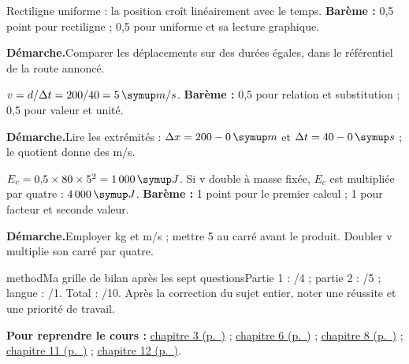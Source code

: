 \label{cor-bb-1}
\par\noindent\begin{minipage}{\linewidth}
Rectiligne uniforme : la position croît linéairement avec le temps. \textbf{Barème :} 0,5 point pour rectiligne ; 0,5 pour uniforme et sa lecture graphique.\par
\smallskip\noindent\textbf{Démarche.}\enspace Comparer les déplacements sur des durées égales, dans le référentiel de la route annoncé.\par
\end{minipage}\par
\par\noindent\begin{minipage}{\linewidth}
$v=d/\Delta t=200/40=5\unite{m/s}$. \textbf{Barème :} 0,5 pour relation et substitution ; 0,5 pour valeur et unité.\par
\smallskip\noindent\textbf{Démarche.}\enspace Lire les extrémités : $\Delta x=200-0\unite m$ et $\Delta t=40-0\unite s$ ; le quotient donne des m/s.\par
{}
\end{minipage}\par
\par\noindent\begin{minipage}{\linewidth}
$E_c=0{,}5\times80\times5^2=1\,000\unite J$. Si v double à masse fixée, $E_c$ est multipliée par quatre : $4\,000\unite J$. \textbf{Barème :} 1 point pour le premier calcul ; 1 pour facteur et seconde valeur.\par
\smallskip\noindent\textbf{Démarche.}\enspace Employer kg et m/s ; mettre 5 au carré avant le produit. Doubler v multiplie son carré par quatre.\par
\end{minipage}\par
\par\noindent\begin{minipage}{\linewidth}
\begin{pcEncadre}{method}{Ma grille de bilan après les sept questions}Partie 1 : /4 ; partie 2 : /5 ; langue : /1. Total : /10. Après la correction du sujet entier, noter une réussite et une priorité de travail.\end{pcEncadre}
{\small\textbf{Pour reprendre le cours : }\hyperref[chap-3]{chapitre 3 (p.~\pageref*{chap-3})} ; \hyperref[chap-6]{chapitre 6 (p.~\pageref*{chap-6})} ; \hyperref[chap-8]{chapitre 8 (p.~\pageref*{chap-8})} ; \hyperref[chap-11]{chapitre 11 (p.~\pageref*{chap-11})} ; \hyperref[chap-12]{chapitre 12 (p.~\pageref*{chap-12})}.\par}\end{minipage}\par
